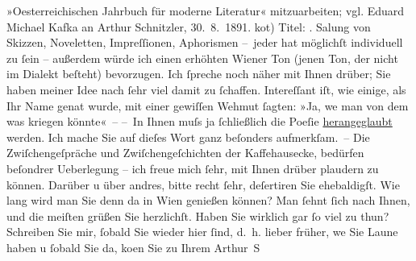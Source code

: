 \begin{ledgroupsized}[t]{13cm}
{{{                  »Oesterreichischen Jahrbuch für moderne Literatur« mitzuarbeiten; vgl. Eduard Michael Kafka an Arthur Schnitzler, 30. 8. 1891.}}}\label{K_L00018_1h} ko{\geminationm}t) Titel: \label{K_L00018_2v}\label{K_L00018_2h}. Sa{\geminationm}lung von Skizzen, Noveletten, Impreſſionen, Aphorismen
                  – {\pb}jeder hat möglichſt individuell zu ſein – außerdem
               würde ich einen erhöhten Wiener Ton (jenen Ton, der
               nicht im Dialekt beſteht) bevorzugen\strikeout{)}.\pend
           \pstart
           Ich ſpreche noch näher mit Ihnen drüber; Sie haben meiner Idee nach ſehr viel damit
               zu ſchaffen. Intereſſant iſt, wie einige, als Ihr Name gena{\geminationn}t wurde, mit einer gewiſſen Wehmut ſagten: »Ja, we{\geminationn}{ }{\pb}man von dem was kriegen könnte« –\pend
           \pstart
           – In Ihnen muſs ja ſchließlich die Poeſie \uline{herangeglaubt} werden. Ich mache Sie auf dieſes Wort ganz beſonders
               aufmerkſam. – Die Zwiſchengeſpräche und Zwiſchengeſchichten der Kaffehausecke,
               bedürfen beſondrer Ueberlegung – ich freue mich ſehr, mit Ihnen drüber plaudern zu
               können. Darüber u über andres, {\pb}bitte recht ſehr,
               deſertiren Sie ehebaldigſt. Wie lang wird man Sie denn da{\geminationn} in Wien genießen können? Man ſehnt ſich nach
               Ihnen, und die meiſten grüßen Sie herzlichſt. Haben Sie wirklich gar ſo viel zu
               thun?\pend
           \pstart
           Schreiben Sie mir, ſobald Sie wieder hier ſind, d. h. lieber früher, we{\geminationn}{ }Sie Laune haben u ſobald Sie da, ko{\geminationm}en Sie zu\pend
           \pstart Ihrem \spacefill\mbox{Arthur S}\pend{}
         
         \endnumbering{}\end{ledgroupsized}  \newcommand{\dateiname}{L00018}\newcommand{\titel}{Arthur Schnitzler an Richard Beer-Hofmann, 6. 6. 1891}\newcommand{\editorInnen}{Martin Anton Müller und Gerd-Hermann Susen}
      